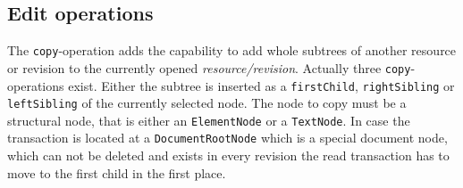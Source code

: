 \subsection{Edit operations}\label{subsec::operations}
The \texttt{copy}-operation adds the capability to add whole subtrees of another resource or revision to the currently opened \emph{resource/revision}. Actually three \texttt{copy}-operations exist. Either the subtree is inserted as a \texttt{first\-Child}, \texttt{rightSibling} or \texttt{leftSibling} of the currently selected node. The node to copy must be a structural node, that is either an \texttt{ElementNode} or a \texttt{TextNode}. In case the transaction is located at a \texttt{DocumentRootNode} which is a special document node, which can not be deleted and exists in every revision the read transaction has to move to the first child in the first place.






